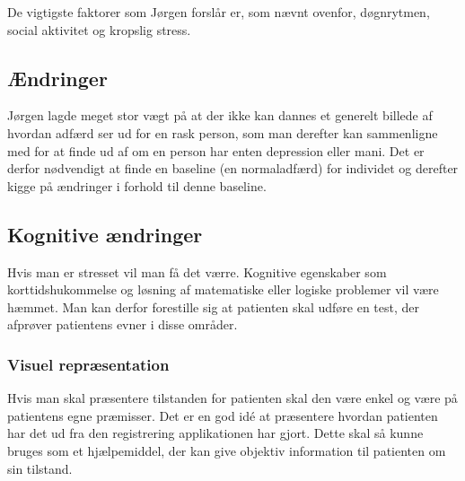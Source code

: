 De vigtigste faktorer som Jørgen forslår er, som nævnt ovenfor, døgnrytmen, social aktivitet og kropslig stress.

\subsection{Ændringer}
Jørgen lagde meget stor vægt på at der ikke kan dannes et generelt billede af hvordan adfærd ser ud for en rask person, som man derefter kan sammenligne med for at finde ud af om en person har enten depression eller mani.
Det er derfor nødvendigt at finde en baseline (en normaladfærd) for individet og derefter kigge på ændringer i forhold til denne baseline.

\subsection{Kognitive ændringer}
Hvis man er stresset vil man få det værre. 
Kognitive egenskaber som korttidshukommelse og løsning af matematiske eller logiske problemer vil være hæmmet.
Man kan derfor forestille sig at patienten skal udføre en test, der afprøver patientens evner i disse områder.

\subsubsection{Visuel repræsentation}
Hvis man skal præsentere tilstanden for patienten skal den være enkel og være på patientens egne præmisser. 
Det er en god idé at præsentere hvordan patienten har det ud fra den registrering applikationen har gjort. 
Dette skal så kunne bruges som et hjælpemiddel, der kan give objektiv information til patienten om sin tilstand.
